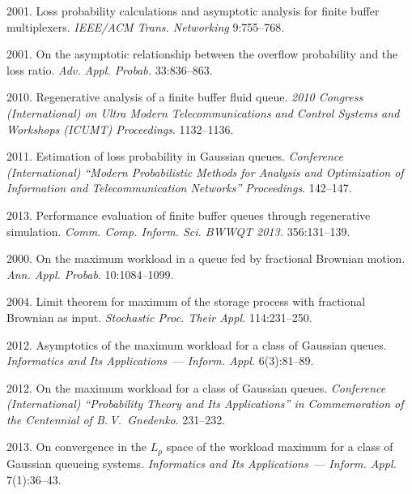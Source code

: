\begin{multicols}{2}
{{\begin{thebibliography}{99}
  2001.
Loss probability calculations and asymptotic analysis for finite buffer
multiplexers. \textit{IEEE/ACM Trans. Networking} 9:755--768.

  2001.
On the asymptotic relationship between the overflow
probability and the loss ratio. \textit{Adv. Appl. Probab.}
33:836--863.

 2010. Regenerative
analysis of a finite buffer fluid queue. \textit{2010
Congress (International) on Ultra Modern Telecommunications and Control Systems and
Workshops (ICUMT) Proceedings}. 1132--1136.

 2011.
Estimation of loss probability
in Gaussian queues. \textit{Conference (International) ``Modern
Probabilistic Methods for Analysis and Optimization of Information and
Telecommunication Networks'' Proceedings}. 142--147.

 2013.
Performance evaluation of finite buffer queues through regenerative simulation.
\textit{Comm. Comp. Inform. Sci. BWWQT 2013.} 356:131--139.

 2000. On the maximum workload in a queue fed
by fractional Brownian motion. \textit{Ann. Appl. Probab}. 10:1084--1099.

2004. Limit theorem for maximum
of the storage process with fractional Brownian as input.
\textit{Stochastic Proc. Their Appl.} 114:231--250.

 2012. Asymptotics of the maximum
workload for a class of Gaussian queues. \textit{Informatics and
Its Applications}~--- \textit{Inform. Appl.}
6(3):81--89.

 2012. On the maximum workload for
a class of Gaussian queues. \textit{Conference (International) ``Probability
Theory and Its Applications'' in Commemoration of the Centennial of
B.\,V.~Gnedenko}. 231--232.

 2013.
On convergence in the $L_p$
space of the workload maximum for a class of Gaussian queueing
systems. \textit{Informatics and Its Applications}~---
\textit{Inform. Appl.} 7(1):36--43.



\end{thebibliography}}}
\end{multicols}
